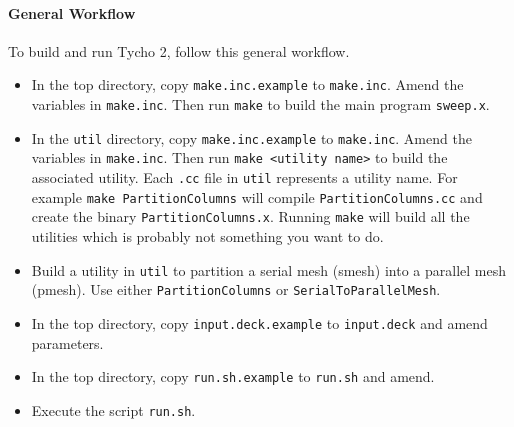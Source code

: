 \documentclass[12pt,letterpaper]{article}
\begin{document}
\paragraph{General Workflow}
To build and run Tycho 2, follow this general workflow.
\begin{itemize}
\item In the top directory, copy {\tt make.inc.example} to {\tt make.inc}.  Amend the variables in {\tt make.inc}.  Then run {\tt make} to build the main program {\tt sweep.x}.
\item In the {\tt util} directory, copy {\tt make.inc.example} to {\tt make.inc}.  Amend the variables in {\tt make.inc}.  Then run {\tt make <utility name>} to build the associated utility.  Each {\tt .cc} file in {\tt util} represents a utility name.  For example {\tt make PartitionColumns} will compile {\tt PartitionColumns.cc} and create the binary {\tt PartitionColumns.x}.  Running {\tt make} will build all the utilities which is probably not something you want to do.
\item Build a utility in {\tt util} to partition a serial mesh (smesh) into a parallel mesh (pmesh).  Use either {\tt PartitionColumns} or {\tt SerialToParallelMesh}.
\item In the top directory, copy {\tt input.deck.example} to {\tt input.deck} and amend parameters.
\item In the top directory, copy {\tt run.sh.example} to {\tt run.sh} and amend.
\item Execute the script {\tt run.sh}.
\end{itemize}
\end{document}

